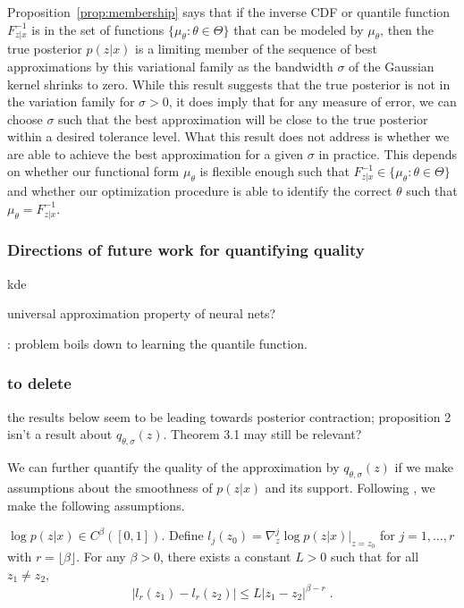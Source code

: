 \documentclass[10pt]{article}
\begin{document}
Proposition~\ref{prop:membership} says that if the inverse CDF or quantile function $F_{z|x}^{-1}$ is in the set of functions $\{\mu_\theta:\theta\in\Theta\}$ that can be modeled by $\mu_\theta$, then the true posterior $p(z|x)$ is a limiting member of the sequence of best approximations by this variational family as the bandwidth $\sigma$ of the Gaussian kernel shrinks to zero. While this result suggests that the true posterior is not in the variation family for $\sigma>0$, it does imply that for any measure of error, we can choose $\sigma$ such that the best approximation will be close to the true posterior within a desired tolerance level. What this result does not address is whether we are able to achieve the best approximation for a given $\sigma$ in practice. This depends on whether our functional form $\mu_\theta$ is flexible enough such that $F_{z|x}^{-1}\in\{\mu_\theta:\theta\in\Theta\}$ and whether our optimization procedure is able to identify the correct $\theta$ such that $\mu_\theta=F_{z|x}^{-1}$.

\subsubsection{Directions of future work for quantifying quality}

\todo kde

\todo universal approximation property of neural nets?


\todo: problem boils down to learning the quantile function. 

\subsubsection{\todo to delete}

\todo the results below seem to be leading towards posterior contraction; proposition 2 isn't a result about $q_{\theta,\sigma}(z)$. Theorem 3.1 may still be relevant?

We can further quantify the quality of the approximation by $q_{\theta,\sigma}(z)$ if we make assumptions about the smoothness of $p(z|x)$ and its support. Following \citet{Plummer:2021}, we make the following assumptions.

\begin{assumption} \label{asp:p1}
$\log p(z|x) \in C^\beta([0,1])$. Define $l_j(z_0) = \nabla_z^j\log p(z|x)\big|_{z=z_0}$ for $j=1,\ldots,r$ with $r=\lfloor\beta\rfloor$. For any $\beta>0$, there exists a constant $L>0$ such that for all $z_1\neq z_2$,
\[
|l_r(z_1)-l_r(z_2)| \leq L|z_1-z_2|^{\beta-r} \;.
\]
\end{assumption}
\end{document}
